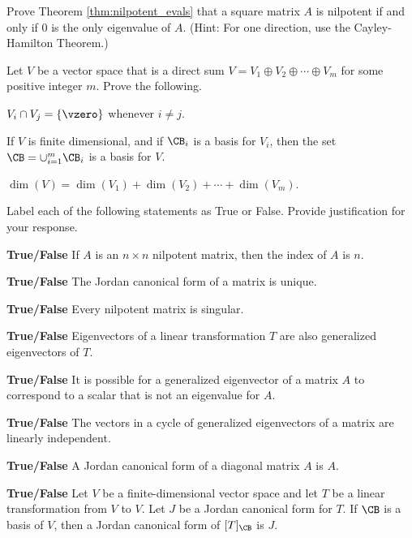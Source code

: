 \ea

\item Prove Theorem \ref{thm:nilpotent_evals} that a square matrix $A$ is nilpotent if and only if 0 is the only eigenvalue of $A$. (Hint: For one direction, use the Cayley-Hamilton Theorem.) 

\item  \label{ex:Direct_sum_properties} Let $V$ be a vector space that is a direct sum $V = V_1 \oplus V_2 \oplus \cdots \oplus V_m$ for some positive integer $m$. Prove the following.
\ba
\item $V_i \cap V_j = \{\vzero\}$ whenever $i \neq j$.
\item If $V$ is finite dimensional, and if $\CB_i$ is a basis for $V_i$, then the set $\CB = \cup_{i=1}^m \CB_i$ is a basis for $V$. 
\item $\dim(V) = \dim(V_1) + \dim(V_2) + \cdots + \dim(V_m)$.
\ea

\item Label each of the following statements as True or False. Provide justification for your response.
	\ba
	\item \textbf{True/False} If $A$ is an $n \times n$ nilpotent matrix, then the index of $A$ is $n$. 
	 	
	\item \textbf{True/False} The Jordan canonical form of a matrix is unique.
	
	\item \textbf{True/False} Every nilpotent matrix is singular. 	

	\item \textbf{True/False} Eigenvectors of a linear transformation $T$ are also generalized eigenvectors of $T$.
	
	\item \textbf{True/False} It is possible for a generalized eigenvector of a matrix $A$ to correspond to a scalar that is not an eigenvalue for $A$. 

	\item \textbf{True/False} The vectors in a cycle of generalized eigenvectors of a matrix are linearly independent.
	
	\item \textbf{True/False} A Jordan canonical form of a diagonal matrix $A$ is $A$.
	
	\item \textbf{True/False} Let $V$ be a finite-dimensional vector space and let $T$ be a linear transformation from $V$ to $V$. Let $J$ be a Jordan canonical form for $T$. If $\CB$ is a basis of $V$, then a Jordan canonical form of $[T]_{\CB}$ is $J$. 
	
